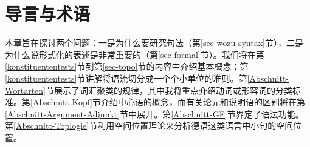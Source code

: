 
\chapter{导言与术语}
\label{Kapitel-Grundbegriffe}



本章旨在探讨两个问题：一是为什么要研究句法（第\ref{sec-wozu-syntax}节），二是为什么说形式化的表述是非常重要的（第\ref{sec-formal}节）。我们将在第\ref{konstituententests}节到第\ref{sec-topo}节的内容中介绍基本概念：第\ref{konstituententests}节讲解将语流切分成一个个小单位的准则。第\ref{Abschnitt-Wortarten}节展示了词汇聚类的规律，其中我将重点介绍动词或形容词的分类标准。第\ref{Abschnitt-Kopf}节介绍中心语的概念，而有关论元和说明语的区别将在第\ref{Abschnitt-Argument-Adjunkt}节中展开。第\ref{Abschnitt-GF}节界定了语法功能。第\ref{Abschnitt-Toplogie}节利用空间位置理论来分析德语这类语言中小句的空间位置。

